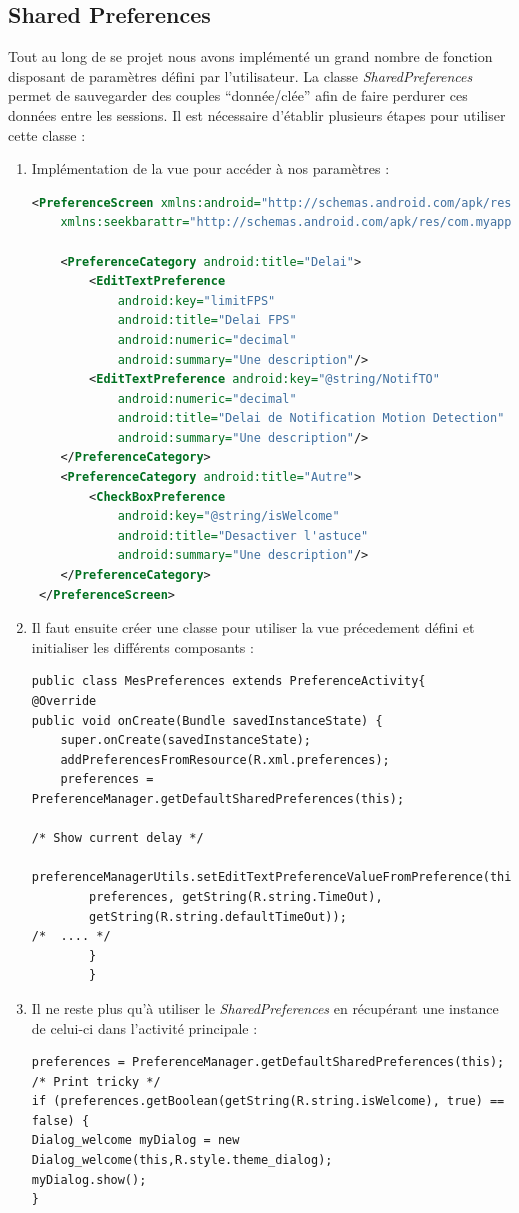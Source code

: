 \subsection{Shared Preferences}
Tout au long de se projet nous avons implémenté un grand nombre de fonction
disposant de paramètres défini par l'utilisateur.
La classe \textit{SharedPreferences} permet de sauvegarder des couples
``donnée/clée'' afin de faire perdurer ces données entre les sessions.\newline
Il est nécessaire d'établir plusieurs étapes pour utiliser cette classe : 
\begin{enumerate}
  \item Implémentation de la vue pour accéder à nos paramètres :
  \begin{lstlisting}[language=XML, format=XML]
  <PreferenceScreen xmlns:android="http://schemas.android.com/apk/res/android"
	xmlns:seekbarattr="http://schemas.android.com/apk/res/com.myapps">

	<PreferenceCategory android:title="Delai">
		<EditTextPreference 
			android:key="limitFPS"
			android:title="Delai FPS" 
			android:numeric="decimal"
			android:summary="Une description"/>
		<EditTextPreference android:key="@string/NotifTO"
			android:numeric="decimal"
			android:title="Delai de Notification Motion Detection"
			android:summary="Une description"/>
	</PreferenceCategory>
	<PreferenceCategory android:title="Autre">
		<CheckBoxPreference 
			android:key="@string/isWelcome"
			android:title="Desactiver l'astuce"
			android:summary="Une description"/>
	</PreferenceCategory>
 </PreferenceScreen> 
  \end{lstlisting}
\item Il faut ensuite créer une classe pour utiliser la vue précedement
défini et initialiser les différents composants :
\begin{lstlisting}
public class MesPreferences extends PreferenceActivity{
@Override
public void onCreate(Bundle savedInstanceState) {
	super.onCreate(savedInstanceState);
	addPreferencesFromResource(R.xml.preferences);
	preferences = PreferenceManager.getDefaultSharedPreferences(this);

/* Show current delay */
	preferenceManagerUtils.setEditTextPreferenceValueFromPreference(this,
		preferences, getString(R.string.TimeOut),
		getString(R.string.defaultTimeOut));
/*	.... */
		}
		}
\end{lstlisting}
\item Il ne reste plus qu'à utiliser le \textit{SharedPreferences} en récupérant
une instance de celui-ci dans l'activité principale : 
\begin{lstlisting}
preferences = PreferenceManager.getDefaultSharedPreferences(this);
/* Print tricky */
if (preferences.getBoolean(getString(R.string.isWelcome), true) == false) {
Dialog_welcome myDialog = new Dialog_welcome(this,R.style.theme_dialog);
myDialog.show();
}
\end{lstlisting}
\end{enumerate}
